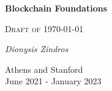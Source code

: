 \makeatletter
\def\@primarycover[#1][#2]{
 \begin{titlepage}
  \centering
  {\huge\bfseries Blockchain Foundations\par}
  \vspace{2cm}
  {\Large \color{red} \textsc{Draft of \today}\par}
  \vspace{2cm}
  {\Large\itshape Dionysis
                  Zindros\par}
  \vfill
  {\large Athens and Stanford\\
          \vspace{1cm}
          #1\\
          #2\par
          }
 \end{titlepage}
}
\@primarycover[June 2021 - January 2023][]
\makeatother
\thispagestyle{empty}\newpage
